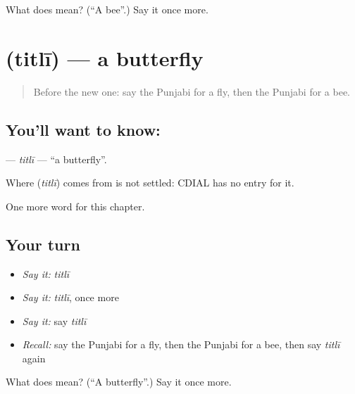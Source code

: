 \begin{tcolorbox}[breakable,colback=teal!4,colframe=teal!35!black,title={Before you move on}]
What does  mean? (\textquotedblleft{}A bee\textquotedblright{}.) Say it once more.
\end{tcolorbox}
\section[\texorpdfstring{\pa{ਤਿਤਲੀ} (titlī)}{ਤਿਤਲੀ (titlī)}]{ (titlī) — a butterfly}

\label{lesson:PA-C132-titli}



\begin{quote}
Before the new one: say the Punjabi for a fly, then the Punjabi for a bee.
\end{quote}

\subsection*{You'll want to know: }
\textbf{} — \emph{titlī} — \textquotedblleft{}a butterfly\textquotedblright{}.

\begin{cousinweb}
Where \textbf{} (\emph{titlī}) comes from is not settled: CDIAL has no entry for it.
\end{cousinweb}

\begin{grammarlens}[title={What you've built}]
One more word for this chapter.
\end{grammarlens}

\subsection*{Your turn}
\begin{itemize}
\raggedright
  \item \emph{Say it:} \emph{titlī}
  \item \emph{Say it:} \emph{titlī}, once more
  \item \emph{Say it:} say \emph{titlī}
  \item \emph{Recall:} say the Punjabi for a fly, then the Punjabi for a bee, then say \emph{titlī} again
\end{itemize}

\begin{tcolorbox}[breakable,colback=teal!4,colframe=teal!35!black,title={Before you move on}]
What does  mean? (\textquotedblleft{}A butterfly\textquotedblright{}.) Say it once more.
\end{tcolorbox}
